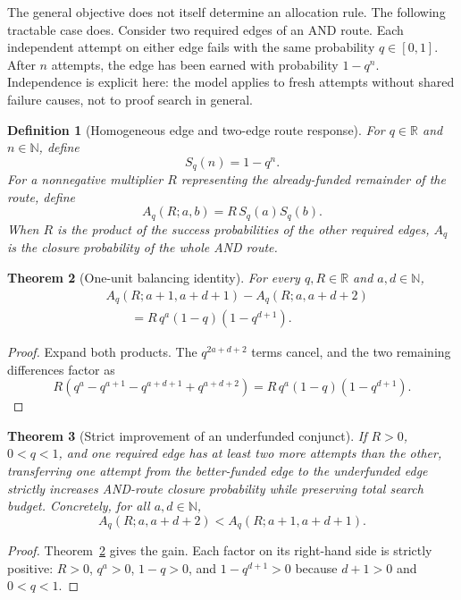 \documentclass[11pt]{article}
\newtheorem{definition}{Definition}[section]
\newtheorem{theorem}[definition]{Theorem}
\begin{document}
The general objective does not itself determine an allocation rule.  The
following tractable case does.  Consider two required edges of an AND route.
Each independent attempt on either edge fails with the same probability
$q\in[0,1]$.  After $n$ attempts, the edge has been earned with probability
$1-q^n$.  Independence is explicit here: the model applies to fresh attempts
without shared failure causes, not to proof search in general.

\begin{definition}[Homogeneous edge and two-edge route response]\label{def:and-response}
For $q\in\mathbb R$ and $n\in\mathbb N$, define
\[
  S_q(n)=1-q^n.
\]
For a nonnegative multiplier $R$ representing the already-funded remainder of
the route, define
\[
  A_q(R;a,b)=R\,S_q(a)S_q(b).
\]
When $R$ is the product of the success probabilities of the other required
edges, $A_q$ is the closure probability of the whole AND route.
\end{definition}

\begin{theorem}[One-unit balancing identity]\label{thm:and-balance-identity}
For every $q,R\in\mathbb R$ and $a,d\in\mathbb N$,
\[
\begin{aligned}
 &A_q(R;a+1,a+d+1)-A_q(R;a,a+d+2)\\
 &\qquad =R\,q^a(1-q)(1-q^{d+1}).
\end{aligned}
\]
\end{theorem}

\begin{proof}
Expand both products.  The $q^{2a+d+2}$ terms cancel, and the two remaining
differences factor as
\[
R(q^a-q^{a+1}-q^{a+d+1}+q^{a+d+2})
=R\,q^a(1-q)(1-q^{d+1}).
\]
\end{proof}

\begin{theorem}[Strict improvement of an underfunded conjunct]\label{thm:and-balance-strict}
If $R>0$, $0<q<1$, and one required edge has at least two more attempts than
the other, transferring one attempt from the better-funded edge to the
underfunded edge strictly increases AND-route closure probability while
preserving total search budget.  Concretely, for all $a,d\in\mathbb N$,
\[
  A_q(R;a,a+d+2)<A_q(R;a+1,a+d+1).
\]
\end{theorem}

\begin{proof}
Theorem~\ref{thm:and-balance-identity} gives the gain.  Each factor on its
right-hand side is strictly positive: $R>0$, $q^a>0$, $1-q>0$, and
$1-q^{d+1}>0$ because $d+1>0$ and $0<q<1$.
\end{proof}
\end{document}
